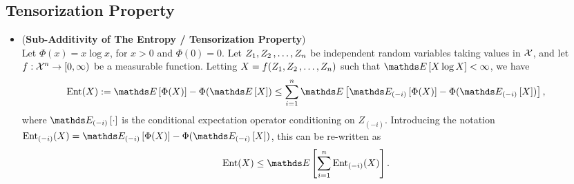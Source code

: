 \documentclass[11pt]{article}
\begin{document}
\subsection{Tensorization Property}
\begin{itemize}
\item \begin{proposition} (\textbf{Sub-Additivity of The Entropy / Tensorization Property}) \citep{boucheron2013concentration}\\
Let $\Phi(x) = x\log x$,  for $x >0$ and $\Phi(0) = 0$. Let $Z_1, Z_2 \,{,}\ldots{,}\, Z_n$ be independent random variables taking values in ${\mathcal X}$, and let $f: {\mathcal X}^n \to [0, \infty)$ be a measurable function. Letting $X = f(Z_1, Z_2 \,{,}\ldots{,}\, Z_n)$ such that $\E{}{X\log X} < \infty$, we have 
\begin{align}
\text{Ent}(X) := \E{}{\Phi(X)} - \Phi(\E{}{X}) &\le \sum_{i=1}^{n}\E{}{\E{(-i)}{\Phi(X)} - \Phi(\E{(-i)}{X})}, \label{ineqn: sub_additivity_phi_entropy}
\end{align} where $\E{(-i)}{\cdot}$ is the conditional expectation operator conditioning on $Z_{(-i)}$. Introducing the notation $\text{Ent}_{(-i)}(X) = \E{(-i)}{\Phi(X)} - \Phi(\E{(-i)}{X})$, this can be re-written as
\begin{align}
\text{Ent}(X)  &\le \E{}{\sum_{i=1}^{n} \text{Ent}_{(-i)}(X)}. \label{ineqn: sub_additivity_phi_entropy_2}
\end{align}
\end{proposition}
\end{itemize}
\end{document}
